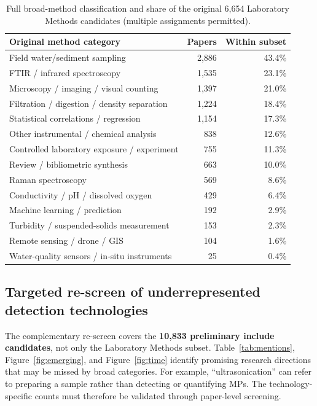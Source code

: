 \documentclass[10pt,a4paper]{article}
\begin{document}
\begin{table}[H]\centering\footnotesize
\caption{Full broad-method classification and share of the original 6,654 Laboratory Methods candidates (multiple assignments permitted).}\label{tab:original-14}
\begin{tabularx}{\linewidth}{@{}Xrr@{}}\toprule
Original method category & Papers & Within subset \\ \midrule
Field water/sediment sampling & 2,886 & 43.4\% \\
FTIR / infrared spectroscopy & 1,535 & 23.1\% \\
Microscopy / imaging / visual counting & 1,397 & 21.0\% \\
Filtration / digestion / density separation & 1,224 & 18.4\% \\
Statistical correlations / regression & 1,154 & 17.3\% \\
Other instrumental / chemical analysis & 838 & 12.6\% \\
Controlled laboratory exposure / experiment & 755 & 11.3\% \\
Review / bibliometric synthesis & 663 & 10.0\% \\
Raman spectroscopy & 569 & 8.6\% \\
Conductivity / pH / dissolved oxygen & 429 & 6.4\% \\
Machine learning / prediction & 192 & 2.9\% \\
Turbidity / suspended-solids measurement & 153 & 2.3\% \\
Remote sensing / drone / GIS & 104 & 1.6\% \\
Water-quality sensors / in-situ instruments & 25 & 0.4\% \\
\bottomrule\end{tabularx}
\end{table}

\subsection{Targeted re-screen of underrepresented detection technologies}
The complementary re-screen covers the \textbf{10,833 preliminary include candidates}, not only the Laboratory Methods subset. Table~\ref{tab:mentions}, Figure~\ref{fig:emerging}, and Figure~\ref{fig:time} identify promising research directions that may be missed by broad categories. For example, ``ultrasonication'' can refer to preparing a sample rather than detecting or quantifying MPs. The technology-specific counts must therefore be validated through paper-level screening.
\end{document}
